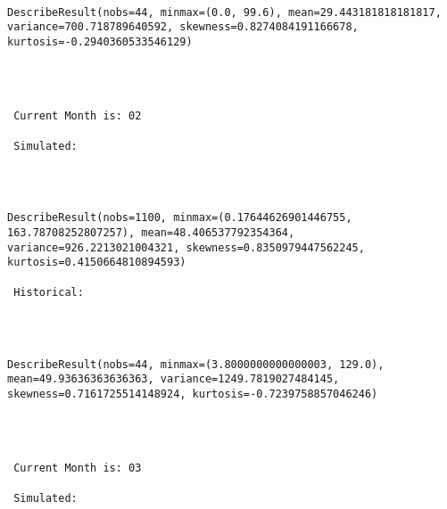\documentclass[11pt]{article}
\begin{document}
    \begin{center}
    \end{center}
    { \hspace*{\fill} \\}
    
    \begin{Verbatim}[commandchars=\\\{\}]
DescribeResult(nobs=44, minmax=(0.0, 99.6), mean=29.443181818181817, variance=700.718789640592, skewness=0.8274084191166678, kurtosis=-0.2940360533546129) 



 
 Current Month is: 02

 Simulated: 
 

    \end{Verbatim}

    \begin{center}
    \end{center}
    { \hspace*{\fill} \\}
    
    \begin{Verbatim}[commandchars=\\\{\}]
DescribeResult(nobs=1100, minmax=(0.17644626901446755, 163.78708252807257), mean=48.406537792354364, variance=926.2213021004321, skewness=0.8350979447562245, kurtosis=0.4150664810894593)

 Historical: 
 

    \end{Verbatim}

    \begin{center}
    \end{center}
    { \hspace*{\fill} \\}
    
    \begin{Verbatim}[commandchars=\\\{\}]
DescribeResult(nobs=44, minmax=(3.8000000000000003, 129.0), mean=49.93636363636363, variance=1249.7819027484145, skewness=0.7161725514148924, kurtosis=-0.7239758857046246) 



 
 Current Month is: 03

 Simulated: 
 

    \end{Verbatim}
\end{document}
